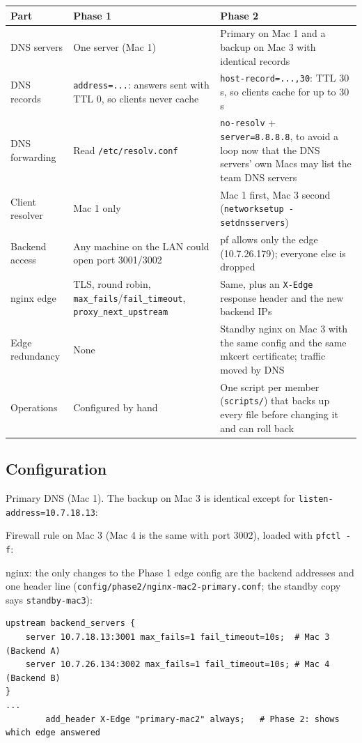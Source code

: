 \documentclass[11pt,a4paper]{article}
\begin{document}
\begin{table}[H]
\centering
\small
\begin{tabularx}{\linewidth}{lYY}
\toprule
Part & Phase 1 & Phase 2 \\
\midrule
DNS servers & One server (Mac 1) & Primary on Mac 1 and a backup on Mac 3 with identical records \\
DNS records & \texttt{address=...}: answers sent with TTL 0, so clients never cache &
  \texttt{host-record=...,30}: TTL 30 s, so clients cache for up to 30 s \\
DNS forwarding & Read \texttt{/etc/resolv.conf} & \texttt{no-resolv} + \texttt{server=8.8.8.8}, to avoid a loop now that the
  DNS servers' own Macs may list the team DNS servers \\
Client resolver & Mac 1 only & Mac 1 first, Mac 3 second (\texttt{networksetup -setdnsservers}) \\
Backend access & Any machine on the LAN could open port 3001/3002 & pf allows only the edge (10.7.26.179); everyone else is dropped \\
nginx edge & TLS, round robin, \texttt{max\_fails}/\texttt{fail\_timeout}, \texttt{proxy\_next\_upstream} &
  Same, plus an \texttt{X-Edge} response header and the new backend IPs \\
Edge redundancy & None & Standby nginx on Mac 3 with the same config and the same mkcert certificate; traffic moved by DNS \\
Operations & Configured by hand & One script per member (\texttt{scripts/}) that backs up every file before changing it and can roll back \\
\bottomrule
\end{tabularx}
\end{table}

\subsection*{Configuration}
Primary DNS (Mac 1). The backup on Mac 3 is identical except for \texttt{listen-address=10.7.18.13}:


Firewall rule on Mac 3 (Mac 4 is the same with port 3002), loaded with \texttt{pfctl -f}:


nginx: the only changes to the Phase 1 edge config are the backend addresses and one header line
(\texttt{config/phase2/nginx-mac2-primary.conf}; the standby copy says \texttt{standby-mac3}):
\begin{lstlisting}
upstream backend_servers {
    server 10.7.18.13:3001 max_fails=1 fail_timeout=10s;  # Mac 3 (Backend A)
    server 10.7.26.134:3002 max_fails=1 fail_timeout=10s; # Mac 4 (Backend B)
}
...
        add_header X-Edge "primary-mac2" always;   # Phase 2: shows which edge answered
\end{lstlisting}
\end{document}
